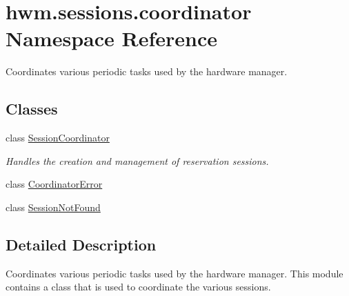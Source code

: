 \hypertarget{namespacehwm_1_1sessions_1_1coordinator}{\section{hwm.\-sessions.\-coordinator Namespace Reference}
\label{namespacehwm_1_1sessions_1_1coordinator}
}


Coordinates various periodic tasks used by the hardware manager.  


\subsection*{Classes}
\begin{DoxyCompactItemize}
\item 
class \hyperlink{classhwm_1_1sessions_1_1coordinator_1_1_session_coordinator}{Session\-Coordinator}
\begin{DoxyCompactList}\small\item\em Handles the creation and management of reservation sessions. \end{DoxyCompactList}\item 
class \hyperlink{classhwm_1_1sessions_1_1coordinator_1_1_coordinator_error}{Coordinator\-Error}
\item 
class \hyperlink{classhwm_1_1sessions_1_1coordinator_1_1_session_not_found}{Session\-Not\-Found}
\end{DoxyCompactItemize}


\subsection{Detailed Description}
Coordinates various periodic tasks used by the hardware manager. This module contains a class that is used to coordinate the various sessions. 